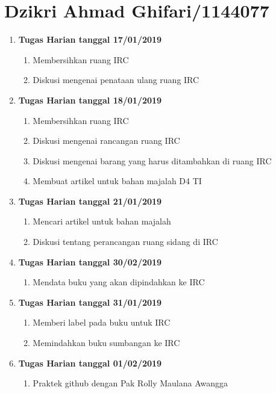 \chapter{Dzikri Ahmad Ghifari/1144077}
\begin{enumerate}
\item \textbf{Tugas Harian tanggal 17/01/2019}
\begin{enumerate}
\item Membersihkan ruang IRC
\item Diskusi mengenai penataan ulang ruang IRC
\end{enumerate}

\item \textbf{Tugas Harian tanggal 18/01/2019}
\begin{enumerate}
\item Membersihkan ruang IRC
\item Diskusi mengenai rancangan ruang IRC
\item Diskusi mengenai barang yang harus ditambahkan di ruang IRC
\item Membuat artikel untuk bahan majalah D4 TI
\end{enumerate}

\item \textbf{Tugas Harian tanggal 21/01/2019}
\begin{enumerate}
\item Mencari artikel untuk bahan majalah
\item Diskusi tentang perancangan ruang sidang di IRC
\end{enumerate}

\item \textbf{Tugas Harian tanggal 30/02/2019}
\begin{enumerate}
\item Mendata buku yang akan dipindahkan ke IRC
\end{enumerate}

\item \textbf{Tugas Harian tanggal 31/01/2019}
\begin{enumerate}
\item Memberi label pada buku untuk IRC
\item Memindahkan buku sumbangan ke IRC
\end{enumerate}

\item \textbf{Tugas Harian tanggal 01/02/2019}
\begin{enumerate}
\item Praktek github dengan Pak Rolly Maulana Awangga 
\end{enumerate}


\end{enumerate}
